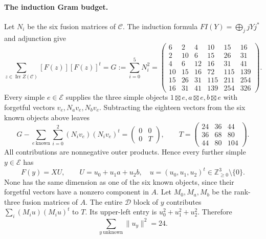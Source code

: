 \documentclass[11pt]{article}
\newcommand{\D}{\mathcal D}
\newcommand{\C}{\mathcal C}
\newcommand{\E}{\mathcal E}
\begin{document}
\paragraph{The induction Gram budget.}
Let $N_i$ be the six fusion matrices of $\C$. The induction formula
$FI(Y)=\bigoplus_j jYj^*$ \cite[Proposition 2.4]{Ostrik} and adjunction
give
\[
 \sum_{z\in\operatorname{Irr}Z(\C)}[F(z)][F(z)]^t
 =G:=\sum_{i=0}^5N_i^2
 =\begin{pmatrix}
6&2&4&10&15&16\\2&10&6&15&26&31\\4&6&12&16&31&41\\
10&15&16&72&115&139\\15&26&31&115&211&254\\16&31&41&139&254&326
\end{pmatrix}.
\]
Every simple $e\in\E$ supplies the three simple objects
$1\boxtimes e,a\boxtimes e,b\boxtimes e$ with forgetful vectors
$v_e,N_av_e,N_bv_e$. Subtracting the eighteen vectors from the six known
objects above leaves
\[
 G-\sum_{e\ \mathrm{known}}\sum_{i=0}^2(N_iv_e)(N_iv_e)^t
 =\begin{pmatrix}0&0\\0&T\end{pmatrix},\qquad
 T=\begin{pmatrix}24&36&44\\36&68&80\\44&80&104\end{pmatrix}.
\]
All contributions are nonnegative outer products. Hence every further
simple $y\in\E$ has
\[
 F(y)=XU,\qquad U=u_0+u_1a+u_2b,
 \quad u=(u_0,u_1,u_2)^t\in\mathbb Z_{\geq0}^3\setminus\{0\}.
\]
None has the same dimension as one of the six known objects, since their
forgetful vectors have a nonzero component in $A$.
Let $M_0,M_a,M_b$ be the rank-three fusion matrices of $A$. The entire
$\D$ block of $y$ contributes
$\sum_i(M_iu)(M_iu)^t$ to $T$. Its upper-left entry is
$u_0^2+u_1^2+u_2^2$. Therefore
\begin{equation}
 \sum_{y\ \mathrm{unknown}}\|u_y\|^2=24.
 \label{eq:budget}
\end{equation}
\end{document}
